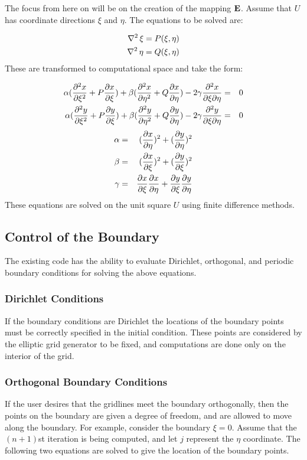The focus from here on will be on the creation of the mapping $\mathord{\mathbf{E}}$.  Assume
that $U$ has coordinate directions $\xi$ and $\eta$.  The equations to 
be solved are:

\begin{eqnarray*}
\mathop{{\nabla}^2}\xi=P(\xi,\eta) \\
\mathop{{\nabla}^2}\eta=Q(\xi,\eta)
\end{eqnarray*}
These are transformed to computational space and take the form:

\begin{eqnarray*}
\alpha(\mathord{\frac{\partial^2{x}}{\partial{\xi}^2}}+P\mathord{\frac{\partial{x}}{\partial{\xi}}})+\beta(\mathord{\frac{\partial^2{x}}{\partial{\eta}^2}}+Q\mathord{\frac{\partial{x}}{\partial{\eta}}})-
2\gamma\mathord{\frac{\partial^2{x}}{\partial{\xi}\partial{\eta}}} &=& 0	\\
\alpha(\mathord{\frac{\partial^2{y}}{\partial{\xi}^2}}+P\mathord{\frac{\partial{y}}{\partial{\xi}}})+\beta(\mathord{\frac{\partial^2{y}}{\partial{\eta}^2}}+Q\mathord{\frac{\partial{y}}{\partial{\eta}}})-
2\gamma\mathord{\frac{\partial^2{y}}{\partial{\xi}\partial{\eta}}} &=& 0        \\
\end{eqnarray*}
\begin{eqnarray*}
\alpha &=& (\mathord{\frac{\partial{x}}{\partial{\eta}}})^2 + (\mathord{\frac{\partial{y}}{\partial{\eta}}})^2	\\
\beta &=& (\mathord{\frac{\partial{x}}{\partial{\xi}}})^2 + (\mathord{\frac{\partial{y}}{\partial{\xi}}})^2	\\
\gamma &=& \mathord{\frac{\partial{x}}{\partial{\xi}}}\mathord{\frac{\partial{x}}{\partial{\eta}}} + \mathord{\frac{\partial{y}}{\partial{\xi}}}\mathord{\frac{\partial{y}}{\partial{\eta}}}    \\
\end{eqnarray*}
These equations are solved on the 
unit square $U$ using finite difference methods.

\subsection{Control of the Boundary}

The existing code has the ability to evaluate Dirichlet, orthogonal, and periodic
boundary conditions for solving the above equations.

\subsubsection{Dirichlet Conditions}
If the boundary conditions are Dirichlet
the locations of the boundary points must be 
correctly specified in the initial condition.  These points are considered
by the elliptic grid generator  
to be fixed, and computations are done only on the interior 
of the grid.

\subsubsection{Orthogonal Boundary Conditions}
If the user desires that the gridlines meet the boundary orthogonally, then
the points on the boundary are given a degree of freedom, and are allowed to
move along the boundary.  For example, consider the boundary $\xi=0$.
Assume that the $(n+1)$st iteration is being computed, and let $j$ represent
the $\eta$ coordinate.  
The following two equations are solved to give the location of the boundary points.

